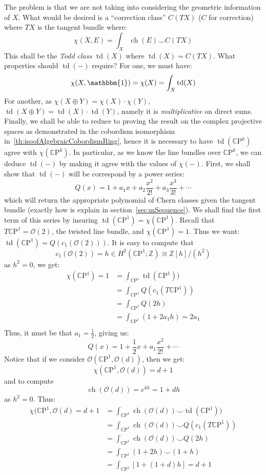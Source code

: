 \documentclass{book}
\newcommand{\Z}{{\mathbb{Z}}}
\newcommand{\CO}{{\mathcal{O}}}
\newcommand{\CP}{\mathbb{C}\mathrm{P}}
\newcommand{\ch}{{\operatorname{ch}}}
\newcommand{\td}{{\operatorname{td}}}
\begin{document}
The problem is that we are not taking into considering the geometric information of $X$. What would be desired
is a ``correction class'' $C(TX)$ ($C$ for correction) where $TX$ is the tangent bundle where:
\[
  \chi(X, E) = \int_X \ch(E) \smile C(TX)
\]
This shall be the \emph{Todd class} $\td(X)$ where $\td(X) = C(TX)$. What properties should $\td(-)$ require? For one, we must have:
\[
  \chi(X, \mathbbm{1}) = \chi(X) = \int_X \td(X)
\]
For another, as $\chi(X\oplus Y) = \chi(X)\cdot \chi(Y)$, $\td(X\oplus Y) = \td(X)\cdot \td(Y)$, namely it is
\emph{multiplicative} on direct sums. Finally, we shall be able to reduce to proving the result  on the complex
projective spaces as demonstrated in the cobordism isomorphism in~\cref{th:isoofAlgebraicCobordismRing}, hence
it is necessary to have $\td(\CP^k)$ agree with $\chi(\CP^k)$. In particular, as we know the line bundles over
$\CP^k$, we can deduce $\td(-)$ by making it agree with the values of $\chi(-)$. First, we shall show that
$\td(-)$ will be correspond by a power series:
\[
  Q(x) = 1 + a_1x + a_2\frac{x^2}{2!} + a_3 \frac{x^3}{3!} +  \cdots
\]
which will return the appropriate polynomial of Chern classes given the tangent bundle (exactly how is explain
in section~\ref{sec:mSequence}). We shall find the first term of this series by insuring $\td(\CP^1) =
\chi(\CP^1)$. Recall that $T\CP^1 = \CO(2)$, the twisted line bundle, and $\chi(\CP^1) = 1$. Thus we want:
$\td(\CP^1) = Q\left(c_1(\CO(2))\right)$. It is easy to compute that
\[
  c_1(\CO(2)) = h \in H^2(\CP^1; \Z) \cong \Z[h]/(h^2)
\]
as $h^2 = 0$, we get:
\begin{align*}
  \chi(\CP^1) = 1 &= \int_{\CP^1} \td(\CP^1))\\
  &= \int_{\CP^1} Q(c_1(T\CP^1))\\
  &= \int_{\CP^1} Q(2h)\\
  &= \int_{\CP^1} (1 + 2a_1h) = 2a_1\\
\end{align*}
Thus, it must be that $a_1 = \frac{1}{2}$, giving us:
\[
  Q(x) = 1 + \frac{1}{2}x + a_1 \frac{x^2}{2!} + \cdots
\]
Notice that if we consider $\CO(\CP^1, \CO(d))$, then we get:
\[
  \chi(\CP^1, \CO(d)) = d+1
\]
and to compute
\[
  \ch(\CO(d)) = e^{kh} = 1 + dh
\]
as $h^2 = 0$. Thus:
\begin{align*}
  \chi(\CP^1, \CO(d) = d+1 &= \int_{\CP^1} \ch(\CO(d)) \smile \td(\CP^1))\\
  &= \int_{\CP^1} \ch(\CO(d)) \smile Q(c_1(T\CP^1))\\
  &= \int_{\CP^1} \ch(\CO(d)) \smile Q(2h)\\
  &= \int_{\CP^1} (1+2h) \smile (1 + h)\\
  &= \int_{\CP^1} [1 + (1 + d)h] = d+1
\end{align*}
\end{document}
